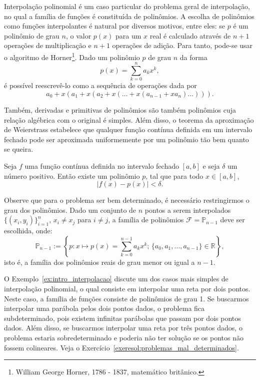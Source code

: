 Interpolação polinomial é um caso particular do problema geral de interpolação, no qual a família de funções é constituída de polinômios. A escolha de polinômios como funções interpolantes é natural por diversos  motivos, entre eles: se $p$ é um polinômio de grau $n$, o valor $p(x)$ para um $x$ real é calculado através de $n+1$ operações de multiplicação e $n+1$ operações de adição. Para tanto, pode-se usar o algoritmo de Horner\footnote{William George Horner, 1786 - 1837, matemático britânico.}. Dado um polinômio $p$ de grau $n$ da forma
\begin{equation}
  p(x)=\sum_{k=0}^{n}a_k x^k,
\end{equation}
é possível reescrevê-lo como a sequência de operações dada por
\begin{equation}
  a_0 + x\left(a_1 + x\left(a_2 + x\left(\ldots + x\left(a_{n-1} + x a_n\right)\ldots\right)\right)\right).
\end{equation}

Também, derivadas e primitivas de polinômios são também polinômios cuja relação algébrica com o original é simples. Além disso, o teorema da aproximação de Weierstrass estabelece que qualquer função contínua definida em um intervalo fechado pode ser aproximada uniformemente por um polinômio tão bem quanto se queira.

\begin{teo}[Weierstrass]Seja $f$ uma função contínua definida no intervalo fechado $[a,b]$ e seja $\delta$ um número positivo. Então existe um polinômio $p$, tal que para todo $x\in[a,b]$,
  \begin{equation}
    |f(x)-p(x)|<\delta.
  \end{equation}
\end{teo}

Observe que para o problema ser bem determinado, é necessário restringirmos o grau dos polinômios. Dado um conjunto de $n$ pontos a serem interpolados $\{(x_i,y_i)\}_{i=1}^{n}$, $x_i\neq x_j$ para $i\neq j$, a família de polinômios $\mathcal{F} = \mathbb{P}_{n-1}$ deve ser escolhida, onde:
\begin{equation}
  \mathbb{P}_{n-1} := \left\{p : x\mapsto p(x) = \sum_{k=0}^{n-1}a_kx^k ;\, \{a_0,a_1,\ldots,a_{n-1}\}\in\mathbb{R}\right\},
\end{equation}
isto é, a família dos polinômios reais de grau menor ou igual a $n-1$.

O Exemplo~\ref{ex:intro_interpolacao} discute um dos casos mais simples de interpolação polinomial, o qual consiste em interpolar uma reta por dois pontos. Neste caso, a família de funções consiste de polinômios de grau 1. Se buscarmos interpolar uma parábola pelos dois pontos dados, o problema fica subdeterminado, pois existem infinitas parábolas que passam por dois pontos dados. Além disso, se buscarmos interpolar uma reta por três pontos dados, o problema estaria sobredeterminado e poderia não ter solução se os pontos não fossem colineares. Veja o Exercício~\ref{exeresol:problemas_mal_determinados}.

